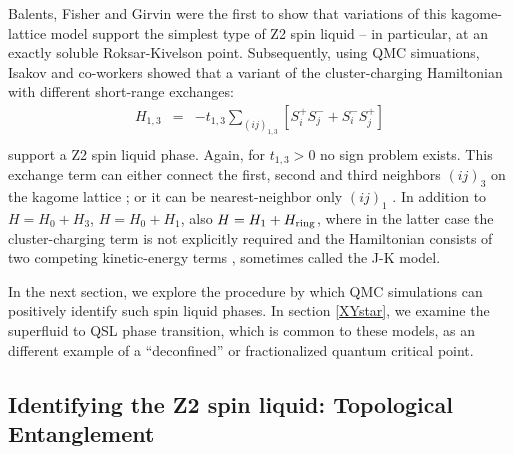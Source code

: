 \documentclass[range]{ar2e}
\begin{document}
Balents, Fisher and Girvin \cite{BFG} were the first to show that variations of this kagome-lattice model support the simplest type of Z2 spin liquid -- in particular, at an exactly soluble Roksar-Kivelson point.  Subsequently, using QMC simuations, Isakov and co-workers showed that a variant of the cluster-charging Hamiltonian with different short-range exchanges: 
\begin{eqnarray}
H_{1,3} &=& -t_{1,3} \sum_{( ij )_{1,3}} [S^{+}_i S^-_j + S^-_i S^{+}_j]  \\
\end{eqnarray}
support a Z2 spin liquid phase.  Again, for $t_{1,3}>0$ no sign problem exists.  This exchange term can either connect the first, second and third neighbors $( ij )_3$ on the kagome lattice \cite{Isakov1,Isakov2}; or it can be nearest-neighbor only $( ij )_1$ \cite{TopoEE}.  
In addition to  $H = H_0 + H_3$, $H = H_0 + H_1$, also $H = H_1 + H_{\rm ring}$, where in the latter case the cluster-charging term is not explicitly required and the Hamiltonian consists of two competing kinetic-energy terms \cite{Long}, sometimes called the J-K model.



In the next section, we explore the procedure by which QMC simulations can positively identify such spin liquid phases.  In section \ref{XYstar}, we examine the superfluid to QSL phase transition, which is common to these models, as an different example of a ``deconfined'' or fractionalized quantum critical point.

\subsection{Identifying the Z2 spin liquid: Topological Entanglement}
\end{document}
